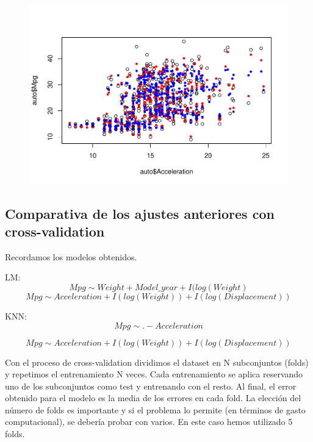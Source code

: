 \begin{figure}[H]\includegraphics[width=.9\linewidth]{img/Regresion_files/figure-latex/unnamed-chunk-33-2} \caption{}\end{figure}

\subsection{Comparativa de los ajustes anteriores con cross-validation}

Recordamos los modelos obtenidos.

\vspace{\baselineskip}
LM: 
\begin{equation}
    Mpg \sim Weight + Model\_year + I(log(Weight)
\end{equation}
\begin{equation}    
    Mpg \sim Acceleration + I(log(Weight)) + I(log(Displacement))
\end{equation}

\vspace{\baselineskip}
KNN: 
\begin{equation}    
    Mpg \sim . - Acceleration
\end{equation}

\begin{equation}    
    Mpg \sim Acceleration + I(log(Weight)) + I(log(Displacement))
\end{equation}

\vspace{\baselineskip}

Con el proceso de cross-validation dividimos el dataset en N subconjuntos (folds) y repetimos el entrenamiento N veces. Cada entrenamiento se aplica reservando uno de los subconjuntos como test y entrenando con el resto. Al final, el error obtenido para el modelo es la media de los errores en cada fold. La elección del número de folds es importante y si el problema lo permite (en términos de gasto computacional), se debería probar con varios. En este caso hemos utilizado 5 folds.

